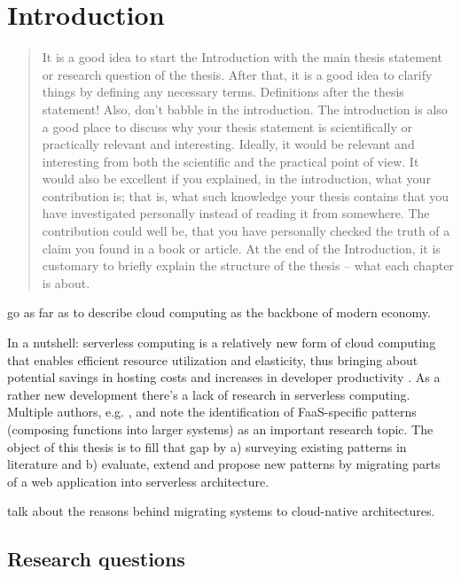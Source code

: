 \documentclass[utf8,english]{gradu3}
\begin{document}
\mainmatter

\chapter{Introduction}

\begin{quote}
It is a good idea to start the Introduction with the main thesis statement or research question of the thesis.  After that, it is a good idea to clarify things by defining any necessary terms. Definitions after the thesis statement!  Also, don't babble in the introduction. The introduction is also a good place to discuss why your thesis statement is scientifically or practically relevant and interesting.  Ideally, it would be relevant and interesting from both the scientific and the practical point of view. It would also be excellent if you explained, in the introduction, what your contribution is; that is, what such knowledge your thesis contains that you have investigated personally instead of reading it from somewhere. The contribution could well be, that you have personally checked the truth of a claim you found in a book or article.  At the end of the Introduction, it is customary to briefly explain the structure of the thesis -- what each chapter is about.
\end{quote}

\textcite{buyya2017manifesto} go as far as to describe cloud computing as the backbone of modern economy.

In a nutshell: serverless computing is a relatively new form of cloud computing that enables efficient resource utilization and elasticity, thus bringing about potential savings in hosting costs and increases in developer productivity \parencite{robert2016serverlessarchitectures}. As a rather new development there's a lack of research in serverless computing. Multiple authors, e.g. \textcite{baldini17currentTrends}, \textcite{fox17} and \textcite{van2017spec} note the identification of FaaS-specific patterns (composing functions into larger systems) as an important research topic. The object of this thesis is to fill that gap by a) surveying existing patterns in literature and b) evaluate, extend and propose new patterns by migrating parts of a web application into serverless architecture.

\textcite{balalaie16migratingcloud} talk about the reasons behind migrating systems to cloud-native architectures.

\section{Research questions}
\end{document}
